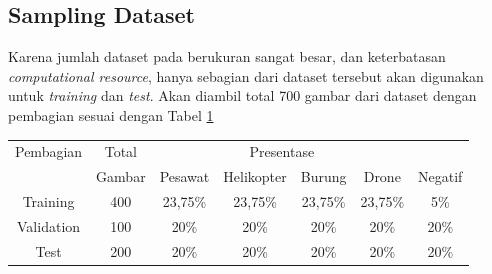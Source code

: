   
  \subsection{Sampling Dataset}
    Karena jumlah dataset pada \textcite{aot_dataset} berukuran sangat besar, dan keterbatasan
    \emph{computational resource}, hanya sebagian dari dataset tersebut akan digunakan untuk \emph{training} dan \emph{test}.
    Akan diambil total 700 gambar dari dataset dengan pembagian sesuai dengan Tabel \ref{tbl:datasetsamplingdist}
    \begin{table}[h]
      \centering
      \label{tbl:datasetsamplingdist}
      \begin{tabular}{|c|c|c|c|c|c|c|}
        \hline
        Pembagian &Total & \multicolumn{4}{c}{Presentase}&\\
                           \cline{2-7}
                  &Gambar& Pesawat & Helikopter & Burung & Drone & Negatif\\
        \hline
        Training  &400 &23,75\%  &23,75\%     &23,75\% &23,75\%       &5\%\\
        \hline                                              
        Validation&100  &20\%     &20\%        &20\%    &20\%          &20\%\\
        \hline                                                           
        Test      &200  &20\%     &20\%        &20\%    &20\%          &20\%\\
        \hline
      \end{tabular}
    \end{table}



